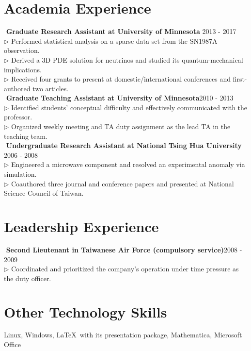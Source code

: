 \documentclass[10pt]{res}
\begin{document}
\begin{resume}
\section{Academia Experience} 
\textbullet\,\,{\bf Graduate Research Assistant at University of Minnesota} \hfill 2013 - 2017\\
$\triangleright$ Performed statistical analysis on a sparse data set from the SN1987A observation.\\  
$\triangleright$ Derived a 3D PDE solution for neutrinos and studied its quantum-mechanical implications.\\
$\triangleright$ Received four grants to present at domestic/international conferences and first-authored two articles.\\
\textbullet\,\,{\bf Graduate Teaching Assistant at University of Minnesota}\hfill 2010 - 2013\\
$\triangleright$ Identified students' conceptual difficulty and effectively communicated with the professor.\\
$\triangleright$ Organized weekly meeting and TA duty assignment as the lead TA in the teaching team.\\
\textbullet\,\,{\bf Undergraduate Research Assistant at National Tsing Hua University} \hfill 2006 - 2008\\
$\triangleright$ Engineered a microwave component and resolved an experimental anomaly via simulation.\\ 
$\triangleright$ Coauthored three journal and conference papers and presented at National Science Council of Taiwan.
\vspace{-0.15 in}
\section{Leadership Experience} 
\textbullet\,\,{\bf Second Lieutenant in Taiwanese Air Force (compulsory service)}\hfill 2008 - 2009\\
$\triangleright$ Coordinated and prioritized the company's operation under time pressure as the duty officer.  
\vspace{-0.15 in}

\section{Other Technology Skills}
\vspace{0.07 in}
Linux, Windows, \LaTeX\ with its presentation package, Mathematica, Microsoft Office%

\end{resume}
\end{document}
